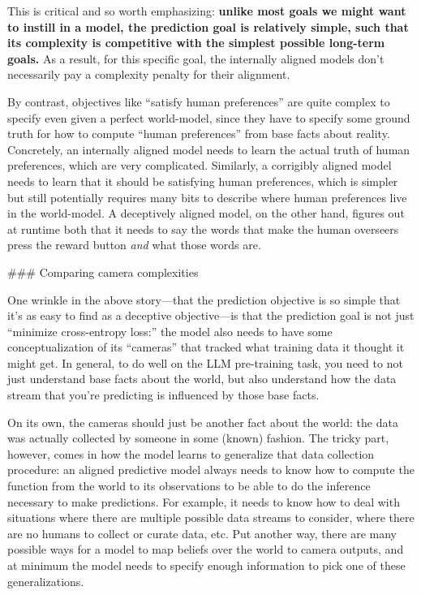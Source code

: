 {This is critical and so worth emphasizing: \textbf{unlike most goals we might want to instill in a model, the prediction goal is relatively simple, such that its complexity is competitive with the simplest possible long-term goals.} As a result, for this specific goal, the internally aligned models don't necessarily pay a complexity penalty for their alignment.

By contrast, objectives like ``satisfy human preferences'' are quite complex to specify even given a perfect world-model, since they have to specify some ground truth for how to compute ``human preferences'' from base facts about reality. Concretely, an internally aligned model needs to learn the actual truth of human preferences, which are very complicated. Similarly, a corrigibly aligned model needs to learn that it should be satisfying human preferences, which is simpler but still potentially requires many bits to describe where human preferences live in the world-model. A deceptively aligned model, on the other hand, figures out at runtime both that it needs to say the words that make the human overseers press the reward button \textit{and} what those words are.


### Comparing camera complexities

One wrinkle in the above story---that the prediction objective is so simple that it's as easy to find as a deceptive objective---is that the prediction goal is not just ``minimize cross-entropy loss:'' the model also needs to have some conceptualization of its ``cameras'' that tracked what training data it thought it might get. In general, to do well on the LLM pre-training task, you need to not just understand base facts about the world, but also understand how the data stream that you're predicting is influenced by those base facts.

On its own, the cameras should just be another fact about the world: the data was actually collected by someone in some (known) fashion. The tricky part, however, comes in how the model learns to generalize that data collection procedure: an aligned predictive model always needs to know how to compute the function from the world to its observations to be able to do the inference necessary to make predictions. For example, it needs to know how to deal with situations where there are multiple possible data streams to consider, where there are no humans to collect or curate data, etc. Put another way, there are many possible ways for a model to map beliefs over the world to camera outputs, and at minimum the model needs to specify enough information to pick one of these generalizations.

}
